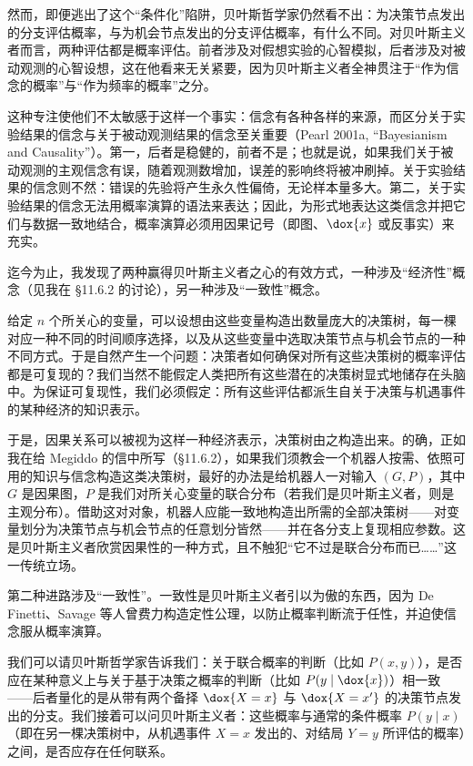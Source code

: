 然而，即便逃出了这个“条件化”陷阱，贝叶斯哲学家仍然看不出：为决策节点发出的分支评估概率，与为机会节点发出的分支评估概率，有什么不同。对贝叶斯主义者而言，两种评估都是概率评估。前者涉及对假想实验的心智模拟，后者涉及对被动观测的心智设想，这在他看来无关紧要，因为贝叶斯主义者全神贯注于“作为信念的概率”与“作为频率的概率”之分。

这种专注使他们不太敏感于这样一个事实：信念有各种各样的来源，而区分关于实验结果的信念与关于被动观测结果的信念至关重要（Pearl 2001a, “Bayesianism and Causality”）。第一，后者是稳健的，前者不是；也就是说，如果我们关于被动观测的主观信念有误，随着观测数增加，误差的影响终将被冲刷掉。关于实验结果的信念则不然：错误的先验将产生永久性偏倚，无论样本量多大。第二，关于实验结果的信念无法用概率演算的语法来表达；因此，为形式地表达这类信念并把它们与数据一致地结合，概率演算必须用因果记号（即图、$\dox{x}$ 或反事实）来充实。

迄今为止，我发现了两种赢得贝叶斯主义者之心的有效方式，一种涉及“经济性”概念（见我在 \S11.6.2 的讨论），另一种涉及“一致性”概念。

给定 $n$ 个所关心的变量，可以设想由这些变量构造出数量庞大的决策树，每一棵对应一种不同的时间顺序选择，以及从这些变量中选取决策节点与机会节点的一种不同方式。于是自然产生一个问题：决策者如何确保对所有这些决策树的概率评估都是可复现的？我们当然不能假定人类把所有这些潜在的决策树显式地储存在头脑中。为保证可复现性，我们必须假定：所有这些评估都派生自关于决策与机遇事件的某种经济的知识表示。

于是，因果关系可以被视为这样一种经济表示，决策树由之构造出来。的确，正如我在给 Megiddo 的信中所写（\S11.6.2），如果我们须教会一个机器人按需、依照可用的知识与信念构造这类决策树，最好的办法是给机器人一对输入 $(G,P)$，其中 $G$ 是因果图，$P$ 是我们对所关心变量的联合分布（若我们是贝叶斯主义者，则是主观分布）。借助这对对象，机器人应能一致地构造出所需的全部决策树——对变量划分为决策节点与机会节点的任意划分皆然——并在各分支上复现相应参数。这是贝叶斯主义者欣赏因果性的一种方式，且不触犯“它不过是联合分布而已……”这一传统立场。

第二种进路涉及“一致性”。一致性是贝叶斯主义者引以为傲的东西，因为 De Finetti、Savage 等人曾费力构造定性公理，以防止概率判断流于任性，并迫使信念服从概率演算。

我们可以请贝叶斯哲学家告诉我们：关于联合概率的判断（比如 $P(x,y)$），是否应在某种意义上与关于基于决策之概率的判断（比如 $P(y\mid\dox{x})$）相一致——后者量化的是从带有两个备择 $\dox{X=x}$ 与 $\dox{X=x'}$ 的决策节点发出的分支。我们接着可以问贝叶斯主义者：这些概率与通常的条件概率 $P(y\mid x)$（即在另一棵决策树中，从机遇事件 $X=x$ 发出的、对结局 $Y=y$ 所评估的概率）之间，是否应存在任何联系。

